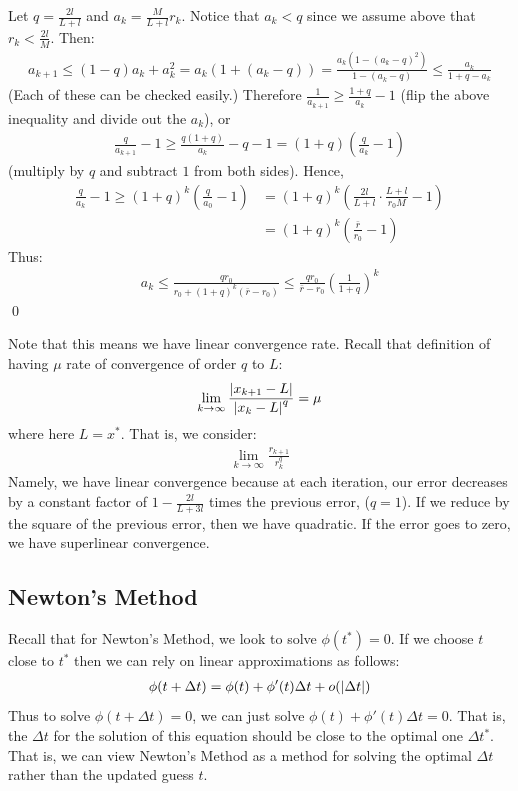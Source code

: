 \documentclass[12pt,a4paper]{article}
\begin{document}
	Let $q = \frac{2l}{L+l}$ and $a_k = \frac{M}{L+l}r_k$. Notice that $a_k < q$ since we assume above that $r_k < \frac{2l}{M}$. Then:
	\begin{align*}
		a_{k+1} \leq (1-q)a_k + a_k^2 = a_k(1 + (a_k - q)) = \frac{a_k(1 - (a_k - q)^2)}{1 - (a_k - q)} \leq \frac{a_k}{1 + q - a_k}
	\end{align*}
	(Each of these can be checked easily.)
	Therefore $\frac{1}{a_{k+1}} \geq \frac{1+q}{a_k} - 1$ (flip the above inequality and divide out the $a_k$), or
	\begin{align*}
		\frac{q}{a_{k+1}} - 1 \geq \frac{q(1+q)}{a_k} - q - 1 = (1+q)(\frac{q}{a_k} - 1)
	\end{align*}
	(multiply by $q$ and subtract $1$ from both sides).
	Hence, 
	\begin{align*}
		\frac{q}{a_k} -1 \geq (1 + q)^k(\frac{q}{a_0}-1) &= (1+q)^k(\frac{2l}{L+l}\cdot \frac{L+l}{r_0M} - 1) \\
		&= (1+q)^k(\frac{\bar{r}}{r_0} - 1)
	\end{align*}
	Thus:
	\begin{align*}
		a_k \leq \frac{qr_0}{r_0 + (1+q)^k(\bar{r}-r_0)} \leq \frac{qr_0}{\bar{r}-r_0}(\frac{1}{1+q})^k
	\end{align*} 
	\qed
	
	Note that this means we have linear convergence rate. Recall that definition of having $\mu$ rate of convergence of order $q$ to $L$:
	\begin{align*}
		\lim_{k \rightarrow \infty}\frac{\abs{x_{k+1} - L}}{\abs{x_k - L}^q} = \mu
	\end{align*}
	where here $L = x^*$. That is, we consider:
	\begin{align*}
		\lim_{k\rightarrow \infty} \frac{r_{k+1}}{r_k^q} 
	\end{align*}
	Namely, we have linear convergence because at each iteration, our error decreases by a constant factor of $1 - \frac{2l}{L+3l}$ times the previous error, ($q = 1$). If we reduce by the square of the previous error, then we have quadratic. If the error goes to zero, we have superlinear convergence.
	
	\subsection*{Newton's Method}
	Recall that for Newton's Method, we look to solve $\phi(t^*) = 0$. If we choose $t$ close to $t^*$ then we can rely on linear approximations as follows:
	\begin{align*}
		\phi(t+ \Delta t) = \phi(t) + \phi'(t)\Delta t + o(\abs{\Delta t})
	\end{align*}
	Thus to solve $\phi(t+\Delta t) = 0$, we can just solve $\phi(t) + \phi'(t)\Delta t = 0$. That is, the $\Delta t$ for the solution of this equation should be close to the optimal one $\Delta t^*$. That is, we can view Newton's Method as a method for solving the optimal $\Delta t$ rather than the updated guess $t$.  
	
\end{document}
